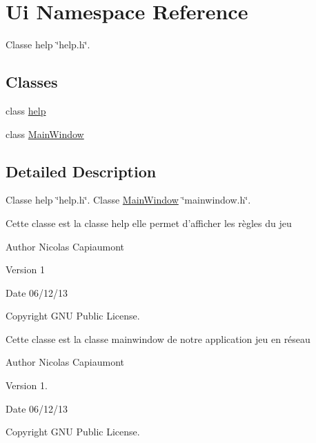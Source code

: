 \hypertarget{namespaceUi}{\section{Ui Namespace Reference}
\label{namespaceUi}
}


Classe help \char`\"{}help.\-h\char`\"{}.  


\subsection*{Classes}
\begin{DoxyCompactItemize}
\item 
class \hyperlink{classUi_1_1help}{help}
\item 
class \hyperlink{classUi_1_1MainWindow}{Main\-Window}
\end{DoxyCompactItemize}


\subsection{Detailed Description}
Classe help \char`\"{}help.\-h\char`\"{}. Classe \hyperlink{classUi_1_1MainWindow}{Main\-Window} \char`\"{}mainwindow.\-h\char`\"{}.

Cette classe est la classe help elle permet d'afficher les règles du jeu \begin{DoxyAuthor}{Author}
Nicolas Capiaumont 
\end{DoxyAuthor}
\begin{DoxyVersion}{Version}
1 
\end{DoxyVersion}
\begin{DoxyDate}{Date}
06/12/13 
\end{DoxyDate}
\begin{DoxyCopyright}{Copyright}
G\-N\-U Public License.
\end{DoxyCopyright}
Cette classe est la classe mainwindow de notre application jeu en réseau \begin{DoxyAuthor}{Author}
Nicolas Capiaumont 
\end{DoxyAuthor}
\begin{DoxyVersion}{Version}
1. 
\end{DoxyVersion}
\begin{DoxyDate}{Date}
06/12/13 
\end{DoxyDate}
\begin{DoxyCopyright}{Copyright}
G\-N\-U Public License. 
\end{DoxyCopyright}
